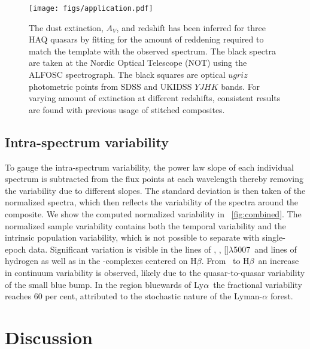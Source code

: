 \documentclass{aa}    %
\newcommand{\figref}[1]{\ref{fig:#1}}
\newcommand{\Fig}[1]{\figurename~\figref{#1}}
\newcommand{\fig}[1]{\Fig{#1}}
\newcommand{\figlabel}[1]{\label{fig:#1}}
\newcommand{\sectlabel}[1]{\label{sect:#1}}
\newcommand{\lya}{Ly$\alpha$}
\newcommand{\hb}{H$\beta$}
\newcommand{\oiii}{[\ion{O}{iii}]$\lambda$5007}
\newcommand{\feii}{\ion{Fe}{ii}}
\newcommand{\civ}{\ion{C}{iv}}
\newcommand{\mgii}{\ion{Mg}{ii}}
\begin{document}
\begin{figure}[t!]
 \centering
 \texttt{[image: figs/application.pdf]}
 \caption[]{The dust extinction, $A_V$, and redshift has been inferred
   for three HAQ quasars by fitting for the amount of reddening
   required to match the template with the observed spectrum. The
   black spectra are taken at the Nordic Optical Telescope (NOT) using
   the ALFOSC spectrograph. The black squares are optical $ugriz$
   photometric points from SDSS and UKIDSS $YJHK$
   bands. For varying amount of extinction at different redshifts,
   consistent results are found with previous usage of stitched
   composites.}  \figlabel{application}
\end{figure}
 
 \subsection{Intra-spectrum variability}  \sectlabel{variability}
 
To gauge the intra-spectrum variability, the power law slope of each individual
spectrum is subtracted from the flux points at each wavelength thereby removing
the variability due to different slopes. The standard deviation is then taken of
the normalized spectra, which then reflects the variability of the spectra around
the composite. We show the computed
 normalized variability in \fig{combined}. The normalized sample variability
contains both the temporal variability and the intrinsic population variability,
which is not possible to separate with single-epoch data. 
Significant variation is visible in the lines of \civ,
\mgii, \oiii~and lines of hydrogen as well as in the \feii-complexes
centered on \hb. From \civ~to \hb~an increase in continuum
variability is observed, likely due to the quasar-to-quasar
variability of the small blue bump. In the region bluewards of \lya~the fractional variability reaches 60 per cent, attributed to the
stochastic nature of the Lyman-$\alpha$ forest.


\section{Discussion}  \sectlabel{discuss}
\end{document}
